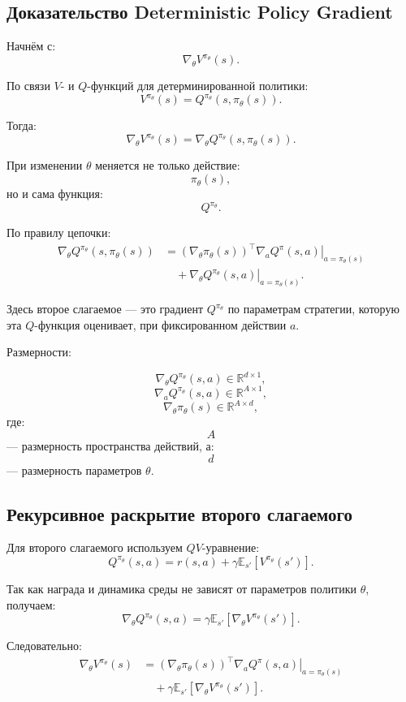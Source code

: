 \documentclass[12pt,a4paper]{article}
\begin{document}
\subsection{Доказательство Deterministic Policy Gradient}

Начнём с:
\[
\nabla_\theta V^{\pi_\theta}(s).
\]

По связи $V$- и $Q$-функций для детерминированной политики:
\[
V^{\pi_\theta}(s)
=
Q^{\pi_\theta}(s,\pi_\theta(s)).
\]

Тогда:
\[
\nabla_\theta V^{\pi_\theta}(s)
=
\nabla_\theta
Q^{\pi_\theta}(s,\pi_\theta(s)).
\]

При изменении $\theta$ меняется не только действие:
\[
\pi_\theta(s),
\]
но и сама функция:
\[
Q^{\pi_\theta}.
\]

По правилу цепочки:
\[
\begin{aligned}
\nabla_\theta
Q^{\pi_\theta}(s,\pi_\theta(s))
&=
\left(
\nabla_\theta \pi_\theta(s)
\right)^\top
\left.
\nabla_a Q^\pi(s,a)
\right|_{a=\pi_\theta(s)}
\\
&\quad+
\left.
\nabla_\theta Q^{\pi_\theta}(s,a)
\right|_{a=\pi_\theta(s)}.
\end{aligned}
\]

Здесь второе слагаемое --- это градиент $Q^{\pi_\theta}$ по параметрам стратегии, которую эта $Q$-функция оценивает, при фиксированном действии $a$.

Размерности:

\[
\nabla_\theta Q^{\pi_\theta}(s,a)
\in
\mathbb R^{d\times 1},
\]
\[
\nabla_a Q^{\pi_\theta}(s,a)
\in
\mathbb R^{A\times 1},
\]
\[
\nabla_\theta \pi_\theta(s)
\in
\mathbb R^{A\times d},
\]
где:
\[
A
\]
--- размерность пространства действий, а:
\[
d
\]
--- размерность параметров $\theta$.

\subsection{Рекурсивное раскрытие второго слагаемого}

Для второго слагаемого используем $QV$-уравнение:
\[
Q^{\pi_\theta}(s,a)
=
r(s,a)
+
\gamma
\mathbb E_{s'}
\left[
V^{\pi_\theta}(s')
\right].
\]

Так как награда и динамика среды не зависят от параметров политики $\theta$, получаем:
\[
\nabla_\theta Q^{\pi_\theta}(s,a)
=
\gamma
\mathbb E_{s'}
\left[
\nabla_\theta V^{\pi_\theta}(s')
\right].
\]

Следовательно:
\[
\begin{aligned}
\nabla_\theta V^{\pi_\theta}(s)
&=
\left(
\nabla_\theta \pi_\theta(s)
\right)^\top
\left.
\nabla_a Q^\pi(s,a)
\right|_{a=\pi_\theta(s)}
\\
&\quad+
\gamma
\mathbb E_{s'}
\left[
\nabla_\theta V^{\pi_\theta}(s')
\right].
\end{aligned}
\]
\end{document}
